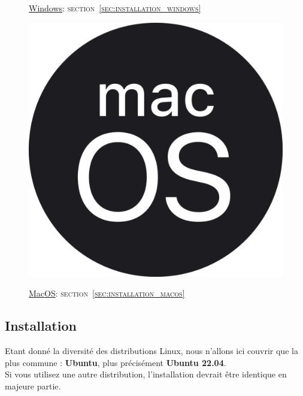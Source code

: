 \begin{figure}[!h]
\begin{minipage}{0.32\textwidth}
    \caption*{\underline{Windows}: \textsc{section~\ref{sec:installation_windows}}}
  \end{minipage}
  \begin{minipage}{0.32\textwidth}
    \centering
    \hyperref[sec:installation_macos]{\includegraphics[scale=0.025]{Images_formation/MacosLogo.pdf}}
    \caption*{\underline{MacOS}: \textsc{section~\ref{sec:installation_macos}}}
  \end{minipage}
\end{figure}
\subsection[Installation Linux]{Installation \linux{}\label{sec:installation_linux}}

\par Etant donné la diversité des distributions Linux, nous n'allons ici couvrir que la plus commune : \textbf{Ubuntu}, plus précisément \textbf{Ubuntu 22.04}. \\
Si vous utilisez une autre distribution, l'installation devrait  être identique en majeure partie.

